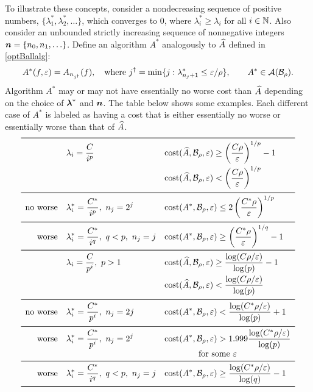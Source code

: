 \documentclass[final]{elsarticle}
\theoremstyle{definition}
\theoremstyle{remark}
\begin{document}
To illustrate these concepts, consider a nondecreasing sequence of positive numbers, $ \{\lambda^*_1, \lambda^*_2, \ldots \}$, which converges to $0$, where $\lambda^*_i \ge \lambda_i$ for all $i \in \mathbb{N}$.  Also consider an unbounded strictly increasing sequence of nonnegative integers $\boldsymbol{n} = \{n_0, n_1, \ldots \}$.  Define an algorithm $A^*$ analogously to $\widehat{A}$ defined in \eqref{optBallalg}:
\begin{equation} \label{altBallalg}
A^*(f,\varepsilon) = A_{n_{j^\dagger}}(f), \quad \text{where } j^\dagger = \min\{ j : \lambda^*_{n_j+1} \le \varepsilon/\rho \}, \qquad A^* \in \mathcal{A}(\mathcal{B}_{\rho}).
\end{equation}
Algorithm $A^*$ may or may not have essentially no worse cost than $\widehat{A}$ depending on the choice of $\boldsymbol{\lambda}^*$ and $\boldsymbol{n}$.  The table below shows some examples.  Each different case of $A^*$ is labeled as having a cost that is either essentially no worse or essentially worse than that of $\widehat{A}$.
\[
\everymath{\displaystyle}
\begin{array}{rllll}
\toprule
&\lambda_i = \frac{C}{i^p}
& 
\cost(\hA,\cb_\rho,\varepsilon) \ge \left ( \frac{C\rho}{\varepsilon} \right)^{1/p} - 1
\\[2ex]
& &
\cost(\hA,\cb_\rho,\varepsilon) 
<  \left ( \frac{C\rho}{\varepsilon} \right)^{1/p}
\\[2ex]
\midrule
\text{no worse}
&
\lambda^*_i = \frac{C^*}{i^p}, \ n_j = 2^j
&
\cost(A^*,\cb_\rho,\varepsilon) \le 
2 \left ( \frac{C^*\rho}{\varepsilon} \right)^{1/p}
\\[2ex]
\midrule
\text{worse}
&
\lambda^*_i = \frac{C^*}{i^q}, \ q<p, \ n_j = j
&
\cost(A^*,\cb_\rho,\varepsilon)  \ge 
\left ( \frac{C^*\rho}{\varepsilon} \right)^{1/q} - 1 
\\[2ex]
\toprule
&\lambda_i = \frac{C}{p^i}, \ p > 1
& 
\cost(\hA,\cb_\rho,\varepsilon) \ge \frac{\log (C\rho/\varepsilon)}{\log(p)} - 1
\\[2ex]
&&
\cost(\hA,\cb_\rho,\varepsilon) < \frac{\log (C\rho/\varepsilon)}{\log(p)}
\\[2ex]
\midrule
\text{no worse}
&
\lambda^*_i = \frac{C^*}{p^i}, \ n_j = 2j
&
\cost(A^*,\cb_\rho,\varepsilon) < \frac{\log (C^*\rho/\varepsilon)}{\log(p)} + 1
\\[2ex]
\midrule
\text{worse}
&
\lambda^*_i = \frac{C^*}{p^i}, \ n_j = 2^j
&
\cost(A^*,\cb_\rho,\varepsilon) > 1.999 \frac{\log (C^*\rho/\varepsilon)}{\log(p)} 
\\[1ex]
&& \qquad \qquad \text{for some } \varepsilon
\\
\midrule
\text{worse}
&
\lambda^*_i = \frac{C^*}{i^q}, \ q<p, \ n_j = j
&
\cost(A^*,\cb_\rho,\varepsilon)  \ge 
\frac{\log (C^*\rho/\varepsilon)}{\log(q)} - 1
\\[2ex]
\toprule
\end{array}
\]
\end{document}

